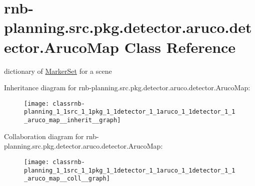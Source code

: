 \hypertarget{classrnb-planning_1_1src_1_1pkg_1_1detector_1_1aruco_1_1detector_1_1_aruco_map}{}\section{rnb-\/planning.src.\+pkg.\+detector.\+aruco.\+detector.\+Aruco\+Map Class Reference}
\label{classrnb-planning_1_1src_1_1pkg_1_1detector_1_1aruco_1_1detector_1_1_aruco_map}


dictionary of \hyperlink{classrnb-planning_1_1src_1_1pkg_1_1detector_1_1aruco_1_1detector_1_1_marker_set}{Marker\+Set} for a scene  




Inheritance diagram for rnb-\/planning.src.\+pkg.\+detector.\+aruco.\+detector.\+Aruco\+Map\+:
\nopagebreak
\begin{figure}[H]
\begin{center}
\leavevmode
\texttt{[image: classrnb-planning\_1\_1src\_1\_1pkg\_1\_1detector\_1\_1aruco\_1\_1detector\_1\_1\_aruco\_map\_\_inherit\_\_graph]}
\end{center}
\end{figure}


Collaboration diagram for rnb-\/planning.src.\+pkg.\+detector.\+aruco.\+detector.\+Aruco\+Map\+:
\nopagebreak
\begin{figure}[H]
\begin{center}
\leavevmode
\texttt{[image: classrnb-planning\_1\_1src\_1\_1pkg\_1\_1detector\_1\_1aruco\_1\_1detector\_1\_1\_aruco\_map\_\_coll\_\_graph]}
\end{center}
\end{figure}
